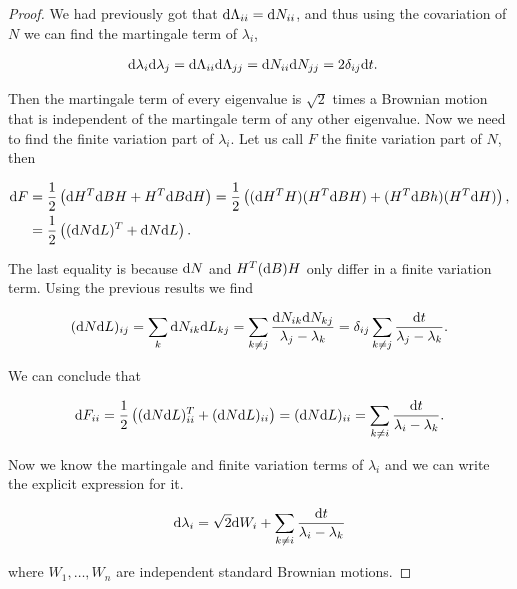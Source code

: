 \begin{proof}
    We had previously got that $\mathrm d \Lambda_{ii} = \mathrm d N_{ii}$, and thus using the covariation of $N$ we can find the martingale term of $\lambda_{i}$,

    \begin{align*}
        \mathrm d \lambda_i\mathrm d \lambda_j &= \mathrm d \Lambda_{ii} \mathrm d\Lambda_{jj} = \mathrm d N_{ii}\mathrm d N_{jj} = 2\delta_{ij}\mathrm d t.
    \end{align*}

    Then the martingale term of every eigenvalue is $\sqrt2$ times a Brownian motion that is independent of the martingale term of any other eigenvalue. Now we need to find the finite variation part of $\lambda_i$. Let us call $F$ the finite variation part of $N$, then

    \begin{align*}
        \mathrm d F &= \frac12\left( \mathrm d H^T \mathrm d B H + H^T \mathrm d B \mathrm d H \right) = \frac12\left( (\mathrm d H^T H)(H^T\mathrm d B H) + (H^T \mathrm d B h)(H^T \mathrm d H) \right),\\ 
        &= \frac12\left( (\mathrm d N \mathrm d L)^T + \mathrm d N \mathrm d L  \right).
    \end{align*}

    The last equality is because $\mathrm d N$ and $H^T (\mathrm d B) H$ only differ in a finite variation term. Using the previous results we find

    \begin{equation*}
        (\mathrm d N \mathrm d L)_{ij} = \sum_{k} \mathrm d N_{ik}\mathrm d L_{kj} = \sum_{k\neq j} \frac{\mathrm d N_{ik}\mathrm d N_{kj}}{\lambda_j - \lambda_k} = \delta_{ij} \sum_{k\neq j} \frac{\mathrm d t}{\lambda_j - \lambda_k}.
    \end{equation*}

    We can conclude that

    \begin{equation*}
        \mathrm d F_{ii} = \frac12\left( (\mathrm d N \mathrm d L)_{ii}^T + (\mathrm d N \mathrm d L)_{ii}  \right) = (\mathrm d N \mathrm d L)_{ii} = \sum_{k\neq i} \frac{\mathrm d t}{\lambda_i - \lambda_k}.
    \end{equation*}

    Now we know the martingale and finite variation terms of $\lambda_i$ and we can write the explicit expression for it.

    \begin{equation*}
        \mathrm d \lambda_i = \sqrt2\mathrm d W_i + \sum_{k\neq i} \frac{\mathrm d t }{\lambda_i - \lambda_k}
    \end{equation*}

    \noindent where $W_1, \dots, W_n$ are independent standard Brownian motions.
\end{proof}







